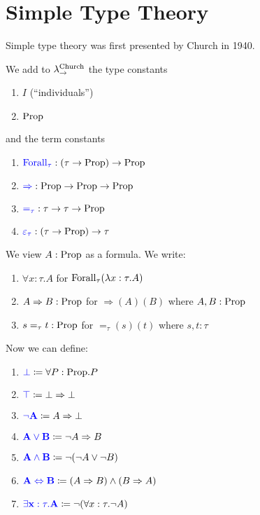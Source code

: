 \section{Simple Type Theory}

Simple type theory was first presented by Church in 1940. 

\begin{boxdefi}
    We add to $\lambda_{\to}^{\textnormal{Church}}$ the type constants 
    \begin{enumerate}
        \item \alert{$I$} (``\alert{individuals}'')
        \item \alert{$\mathrm{Prop}$}
    \end{enumerate}
    and the term constants 
    \begin{enumerate}
        \item $\alert{\forallterm{\tau}} : (\tau \to \proptype) \to \proptype$
        \item $\alert{{\Rightarrow}} : \proptype \to \proptype \to \proptype$
        \item $\alert{=_\tau} : \tau \to \tau \to \proptype$
        \item $\alert{\varepsilon_\tau} : (\tau \to \proptype) \to \tau$
    \end{enumerate}
    We view $A : \mathrm{Prop}$ as a formula. 
    We write: 
    \begin{enumerate}
        \item $\forall x : \tau. A$ for $\mathrm{Forall}_{\tau}(\lambda x : \tau.A)$
        \item $A \Rightarrow B : \mathrm{Prop}$ for ${\Rightarrow} (A)(B)$ where $A, B : \mathrm{Prop}$
        \item $s =_\tau t : \mathrm{Prop}$ for ${=_\tau}(s)(t)$ where $s, t : \tau$
    \end{enumerate}
    Now we can define: 
    \begin{enumerate}
        \item $\alert{\bot} \coloneq \forall P : \proptype. P$
        \item $\alert{\top} \coloneq \bot \Rightarrow \bot$
        \item $\alert{\neg A} \coloneq A \Rightarrow \bot$
        \item $\alert{A \vee B} \coloneq \neg A \Rightarrow B$
        \item $\alert{A \wedge B} \coloneq \neg (\neg A \vee \neg B)$
        \item $\alert{A \Leftrightarrow B} \coloneq (A \Rightarrow B) \wedge (B \Rightarrow A)$
        \item $\alert{\exists x : \tau. A} \coloneq \neg (\forall x : \tau. \neg A)$
    \end{enumerate}
\end{boxdefi}

